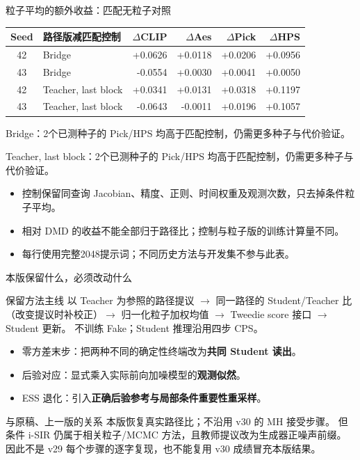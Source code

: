 \documentclass[10pt,aspectratio=169]{beamer}
\begin{document}
\begin{frame}{粒子平均的额外收益：匹配无粒子对照}
\scriptsize\centering
\begin{tabular}{clrrrr}\toprule
Seed & 路径版减匹配控制 & $\Delta$CLIP & $\Delta$Aes & $\Delta$Pick & $\Delta$HPS\\\midrule
42 & Bridge & +0.0626 & +0.0118 & +0.0206 & +0.0956 \\
43 & Bridge & -0.0554 & +0.0030 & +0.0041 & +0.0050 \\
42 & Teacher, last block & +0.0341 & +0.0131 & +0.0318 & +0.1197 \\
43 & Teacher, last block & -0.0643 & -0.0011 & +0.0196 & +0.1057 \\
\bottomrule\end{tabular}\par\raggedright\vspace{5pt}
Bridge：2个已测种子的 Pick/HPS 均高于匹配控制，仍需更多种子与代价验证。\par Teacher, last block：2个已测种子的 Pick/HPS 均高于匹配控制，仍需更多种子与代价验证。
\begin{itemize}\itemsep4pt
\item 控制保留同查询 Jacobian、精度、正则、时间权重及观测次数，只去掉条件粒子平均。
\item 相对 DMD 的收益不能全部归于路径比；控制与粒子版的训练计算量不同。
\item 每行使用完整2048提示词；不同历史方法与开发集不参与此表。
\end{itemize}
\end{frame}


\begin{frame}{本版保留什么，必须改动什么}
\small
\begin{block}{保留方法主线}
以 Teacher 为参照的路径提议 $\to$ 同一路径的 Student/Teacher 比（改变提议时补校正）$\to$
归一化粒子加权均值 $\to$ Tweedie score 接口 $\to$ Student 更新。
不训练 Fake；Student 推理沿用四步 CPS。
\end{block}
\begin{itemize}\itemsep4pt
\item 零方差末步：把两种不同的确定性终端改为\textbf{共同 Student 读出}。
\item 后验对应：显式乘入实际前向加噪模型的\textbf{观测似然}。
\item ESS 退化：引入\textbf{正确后验参考与局部条件重要性重采样}。
\end{itemize}
\begin{alertblock}{与原稿、上一版的关系}
本版恢复真实路径比；不沿用 v30 的 MH 接受步骤。
但条件 i-SIR 仍属于相关粒子/MCMC 方法，且教师提议改为生成器正噪声前缀。
因此不是 v29 每个步骤的逐字复现，也不能复用 v30 成绩冒充本版结果。
\end{alertblock}
\end{frame}
\end{document}
